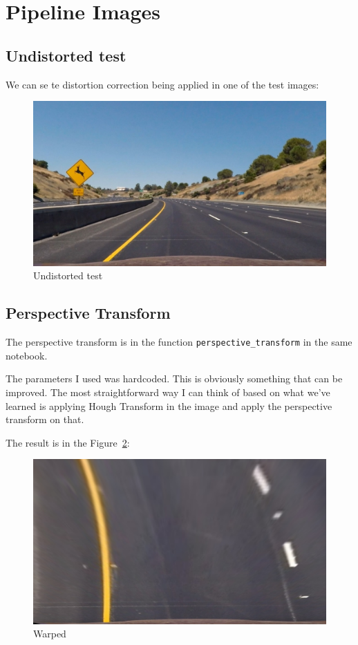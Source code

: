 \documentclass[11pt, a4paper]{article}
\begin{document}
\section{Pipeline Images}
\label{sec:pipeline_images}

\subsection{Undistorted test}%
\label{sub:undistorted_test}


We can se te distortion correction being applied in one of the test images:

\begin{figure}[htb!]
	\centering
	\includegraphics[width=0.8\linewidth]{undist}
	\caption{Undistorted test}
	\label{fig:undistorted_test}
\end{figure}

\subsection{Perspective Transform}%
\label{sub:perspective_transform}

The perspective transform is in the function \texttt{perspective\_transform} in the same notebook.

The parameters I used was hardcoded. This is obviously something that can be improved. The most straightforward way I can think of based on what we've learned is applying Hough Transform in the image and apply the perspective transform on that. 

The result is in the Figure~\ref{fig:warped}:


\begin{figure}[htb!]
	\centering
	\includegraphics[width=0.8\linewidth]{warped}
	\caption{Warped}
	\label{fig:warped}
\end{figure}
\end{document}
